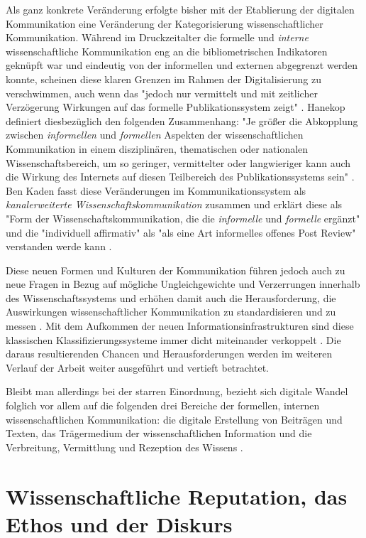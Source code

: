 Als ganz konkrete Veränderung erfolgte bisher mit der Etablierung der digitalen Kommunikation eine Veränderung der Kategorisierung wissenschaftlicher Kommunikation. Während im Druckzeitalter die formelle und \textit{interne} wissenschaftliche Kommunikation eng an die bibliometrischen Indikatoren geknüpft war und eindeutig von der informellen und externen abgegrenzt werden konnte, scheinen diese klaren Grenzen im Rahmen der Digitalisierung zu verschwimmen, auch wenn das "jedoch nur vermittelt und mit zeitlicher Verzögerung Wirkungen auf das formelle Publikationssystem zeigt" \cite{Hanekop_2014}. Hanekop definiert diesbezüglich den folgenden Zusammenhang: "Je größer die Abkopplung zwischen \textit{informellen} und \textit{formellen} Aspekten der wissenschaftlichen Kommunikation in einem disziplinären, thematischen oder nationalen Wissenschaftsbereich, um so geringer, vermittelter oder langwieriger kann auch die Wirkung des Internets auf diesen Teilbereich des Publikationssystems sein" \cite{Hanekop_2014}. Ben Kaden fasst diese Veränderungen im Kommunikationssystem als \textit{kanalerweiterte Wissenschaftskommunikation} zusammen und erklärt diese als "Form der Wissenschaftskommunikation, die die \textit{informelle} und \textit{formelle} ergänzt" und die "individuell affirmativ" als "als eine Art informelles offenes Post Review" verstanden werde kann \cite{kaden_2009_library}.

Diese neuen Formen und Kulturen der Kommunikation führen jedoch auch zu neue Fragen in Bezug auf mögliche Ungleichgewichte und Verzerrungen innerhalb des Wissenschaftssystems und erhöhen damit auch die Herausforderung, die Auswirkungen wissenschaftlicher Kommunikation zu standardisieren und zu messen \cite{gerber_2014_science}. Mit dem Aufkommen der neuen Informationsinfrastrukturen sind diese klassischen Klassifizierungssysteme immer dicht miteinander verkoppelt \cite[:326]{bowker_2000_sorting}. Die daraus resultierenden Chancen und Herausforderungen werden im weiteren Verlauf der Arbeit weiter ausgeführt und vertieft betrachtet.

Bleibt man allerdings bei der starren Einordnung, bezieht sich digitale Wandel folglich vor allem auf die folgenden drei Bereiche der formellen, internen wissenschaftlichen Kommunikation: die digitale Erstellung von Beiträgen und Texten, das Trägermedium der wissenschaftlichen Information und die Verbreitung, Vermittlung und Rezeption des Wissens \cite{bbaw_publizieren_2015}.

\section{Wissenschaftliche Reputation, das Ethos und der Diskurs}

